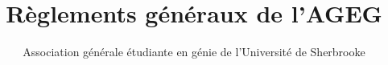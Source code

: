 \documentclass[10pt,letterpaper]{report}
\title{Règlements généraux de l’AGEG}
\author{Association générale étudiante en génie de l'Université de Sherbrooke}
\begin{document}

\tableofcontents
\newpage

\begin{sloppypar}















\end{sloppypar}
\end{document}
